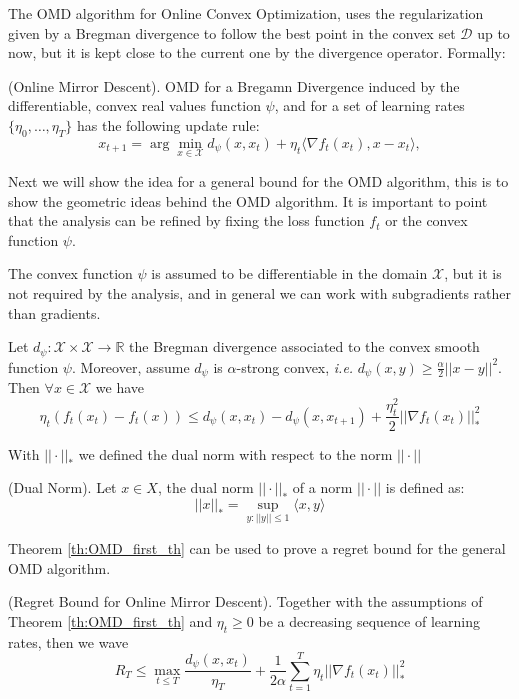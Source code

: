 The OMD algorithm for Online Convex Optimization, uses the regularization given by a Bregman divergence to follow the best point in the convex set $\mathcal D$ up to now, but it is kept close to the current one by the divergence operator. Formally:

\begin{definition}(Online Mirror Descent). OMD for a Bregamn Divergence induced by the differentiable, convex real values function $\psi$, and for a set of learning rates $\{\eta_0,\ldots,\eta_T\}$ has the following update rule: 
$$x_{t+1} =\arg\min\limits_{x\in\mathcal X} d_\psi(x,x_t)+\eta_t\langle\nabla f_t(x_t),x-x_t\rangle,$$
\end{definition}

Next we will show the idea for a general bound for the OMD algorithm, this is to show the geometric ideas behind the OMD algorithm. It is important to point that the analysis can be refined by fixing the loss function $f_t$ or the convex function $\psi$.

The convex function $\psi$ is assumed to be differentiable in the domain $\mathcal X$, but it is not required by the analysis, and in general we can work with subgradients rather than gradients.   

\begin{theorem}\label{th:OMD_first_th}
Let $d_\psi:\mathcal X\times\mathcal X\to \mathbb R$ the Bregman divergence associated to the convex smooth function $\psi$. Moreover, assume $d_\psi$ is $\alpha$-strong convex, \emph{i.e.} $d_\psi(x,y)\ge\frac{\alpha}{2}||x-y||^2$.
Then $\forall x\in\mathcal X$ we have 
$$\eta_t (f_t(x_t)-f_t(x))\le d_\psi(x,x_t)-d_\psi(x,x_{t+1})+\frac{\eta_t^2}{2}||\nabla f_t(x_t)||_*^2$$ 
\end{theorem}

With $||\cdot||_*$ we defined the dual norm with respect to the norm $||\cdot||$ 

\begin{definition}(Dual Norm).
Let $x\in X$, the dual norm $||\cdot||_*$ of a norm $||\cdot||$ is defined as:
$$||x||_*=\sup\limits_{y:||y||\le1}\langle x,y\rangle$$
\end{definition}

Theorem \ref{th:OMD_first_th} can be used to prove a regret bound for the general OMD algorithm. 

\begin{theorem}(Regret Bound for Online Mirror Descent). Together with the assumptions of Theorem \ref{th:OMD_first_th} and $\eta_t\ge0$ be a decreasing sequence of learning rates, then we wave 
$$R_T\le\max\limits_{t\le T}\frac{d_\psi(x,x_t)}{\eta_T}+\frac{1}{2\alpha}\sum\limits_{t=1}^T\eta_t||\nabla f_t(x_t)||_*^2$$
\end{theorem}

